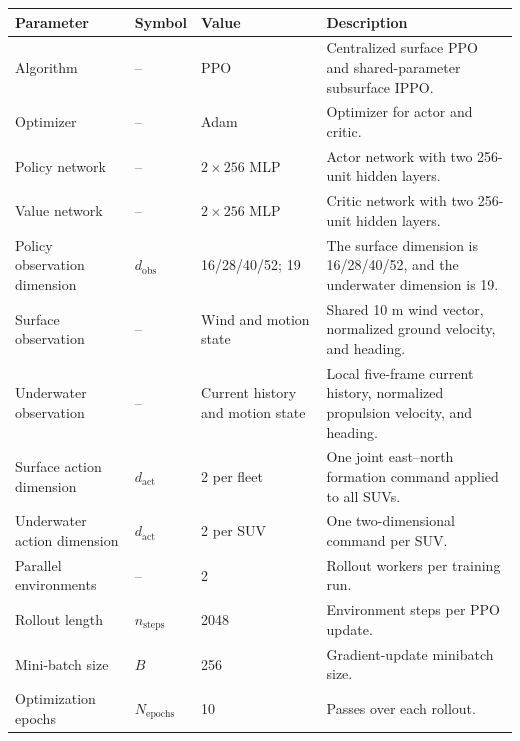 \documentclass[a4paper,fleqn]{cas-dc}
\begin{document}
\noindent\begin{minipage}{\textwidth}
\centering
\fontsize{9.5pt}{10.7pt}\selectfont
\renewcommand{\arraystretch}{1.45}
\begingroup
\captionsetup{justification=raggedright,singlelinecheck=false}
\endgroup
\label{tab:ippo_hyperparams}
\setlength{\tabcolsep}{4pt}
\begin{tabular*}{\textwidth}{@{\extracolsep{\fill}}p{}p{}p{}p{}@{}}
\toprule
Parameter & Symbol & Value & Description \\
\midrule
Algorithm & -- & PPO &
Centralized surface PPO and shared-parameter subsurface IPPO. \\
Optimizer & -- & Adam &
Optimizer for actor and critic. \\
Policy network & -- & $2\times256$ MLP &
Actor network with two 256-unit hidden layers. \\
Value network & -- & $2\times256$ MLP &
Critic network with two 256-unit hidden layers. \\
Policy observation dimension & $d_{\mathrm{obs}}$ & 16/28/40/52; 19 &
The surface dimension is 16/28/40/52, and the underwater dimension is 19. \\
Surface observation & -- & Wind and motion state &
Shared 10 m wind vector, normalized ground velocity, and heading. \\
Underwater observation & -- & Current history and motion state &
Local five-frame current history, normalized propulsion velocity, and heading. \\
Surface action dimension & $d_{\mathrm{act}}$ & 2 per fleet &
One joint east--north formation command applied to all SUVs. \\
Underwater action dimension & $d_{\mathrm{act}}$ & 2 per SUV &
One two-dimensional command per SUV. \\
Parallel environments & -- & 2 &
Rollout workers per training run. \\
Rollout length & $n_{\mathrm{steps}}$ & 2048 &
Environment steps per PPO update. \\
Mini-batch size & $B$ & 256 &
Gradient-update minibatch size. \\
Optimization epochs & $N_{\mathrm{epochs}}$ & 10 &
Passes over each rollout. \\

\end{tabular*}
\end{minipage}
\end{document}

